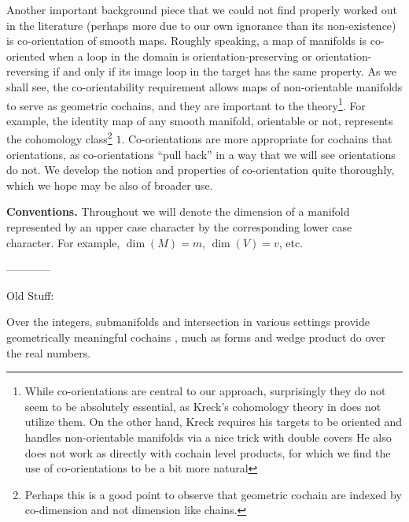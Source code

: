 Another important background piece that we could not find properly worked out in the literature (perhaps more due to our own ignorance than its non-existence) is co-orientation of smooth maps. Roughly speaking, a map of manifolds is co-oriented when a loop in the domain is orientation-preserving or orientation-reversing if and only if its image loop in the target has the same property. As we shall see, the co-orientability requirement allows maps of non-orientable manifolds to serve as geometric cochains, and they are important to the theory\footnote{While co-orientations are central to our approach, surprisingly they do not seem to be absolutely essential, as Kreck's cohomology theory in \cite{Krec10} does not utilize them. On the other hand, Kreck requires his targets to be oriented and handles non-orientable manifolds via a nice trick with double covers  He also does not work as directly with cochain level products, for which we find the use of co-orientations to be a bit more natural}. For example, the identity map of any smooth manifold, orientable or not, represents the cohomology class\footnote{Perhaps this is a good point to observe that geometric cochain are indexed by co-dimension and not dimension like chains.} $1$. Co-orientations are more appropriate for cochains that orientations, as co-orientations ``pull back'' in a way that we will see orientations do not. We develop the notion and properties of co-orientation quite thoroughly, which we hope may be also of broader use.








\textbf{Conventions.} Throughout we will denote the dimension of a manifold represented by an upper case character by the corresponding lower case character. For example, $\dim(M) = m$, $\dim(V) = v$, etc.



------------

Old Stuff:


Over the integers, submanifolds and intersection in various settings provide geometrically meaningful cochains \cite{Lipy14, Joyc15},
much as forms and wedge product do over the real numbers.

